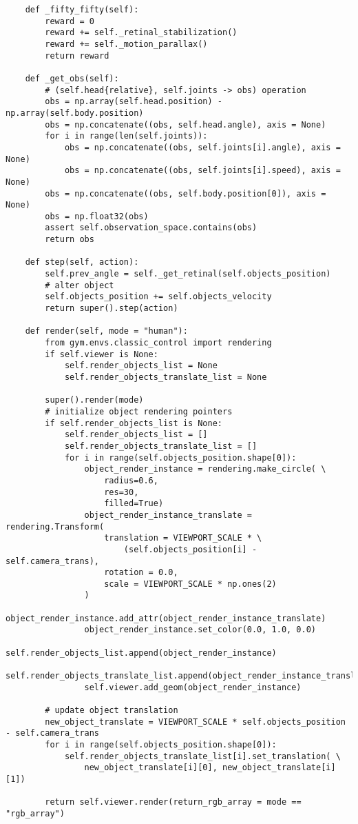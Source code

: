 \begin{lstlisting}
    def _fifty_fifty(self):
        reward = 0
        reward += self._retinal_stabilization()
        reward += self._motion_parallax()
        return reward

    def _get_obs(self):
        # (self.head{relative}, self.joints -> obs) operation
        obs = np.array(self.head.position) - np.array(self.body.position)
        obs = np.concatenate((obs, self.head.angle), axis = None)
        for i in range(len(self.joints)):
            obs = np.concatenate((obs, self.joints[i].angle), axis = None)
            obs = np.concatenate((obs, self.joints[i].speed), axis = None)
        obs = np.concatenate((obs, self.body.position[0]), axis = None)
        obs = np.float32(obs)
        assert self.observation_space.contains(obs)
        return obs

    def step(self, action):
        self.prev_angle = self._get_retinal(self.objects_position)
        # alter object
        self.objects_position += self.objects_velocity
        return super().step(action)

    def render(self, mode = "human"):
        from gym.envs.classic_control import rendering
        if self.viewer is None:
            self.render_objects_list = None
            self.render_objects_translate_list = None

        super().render(mode)
        # initialize object rendering pointers
        if self.render_objects_list is None:
            self.render_objects_list = []
            self.render_objects_translate_list = []
            for i in range(self.objects_position.shape[0]):
                object_render_instance = rendering.make_circle( \
                    radius=0.6,
                    res=30,
                    filled=True)
                object_render_instance_translate = rendering.Transform(
                    translation = VIEWPORT_SCALE * \
                        (self.objects_position[i] - self.camera_trans),
                    rotation = 0.0,
                    scale = VIEWPORT_SCALE * np.ones(2)
                )
                object_render_instance.add_attr(object_render_instance_translate)
                object_render_instance.set_color(0.0, 1.0, 0.0)
                self.render_objects_list.append(object_render_instance)
                self.render_objects_translate_list.append(object_render_instance_translate)
                self.viewer.add_geom(object_render_instance)

        # update object translation
        new_object_translate = VIEWPORT_SCALE * self.objects_position - self.camera_trans
        for i in range(self.objects_position.shape[0]):
            self.render_objects_translate_list[i].set_translation( \
                new_object_translate[i][0], new_object_translate[i][1])

        return self.viewer.render(return_rgb_array = mode == "rgb_array")
\end{lstlisting}
